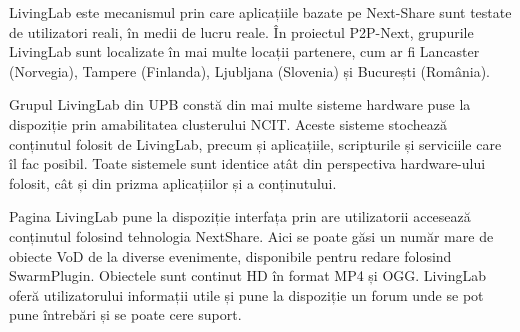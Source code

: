 LivingLab este mecanismul prin care aplicațiile bazate pe Next-Share sunt
testate de utilizatori reali, în medii de lucru reale. În proiectul P2P-Next,
grupurile LivingLab sunt localizate în mai multe locații partenere, cum ar fi
Lancaster (Norvegia), Tampere (Finlanda), Ljubljana (Slovenia) și București
(România).


Grupul LivingLab din UPB constă din mai multe sisteme hardware puse la
dispoziție prin amabilitatea clusterului NCIT. Aceste sisteme stochează
conținutul folosit de LivingLab, precum și aplicațiile, scripturile și
serviciile care îl fac posibil. Toate sistemele sunt identice atât din
perspectiva hardware-ului folosit, cât și din prizma aplicațiilor și a
conținutului.

Pagina LivingLab pune la
dispoziție interfața prin are utilizatorii accesează conținutul folosind
tehnologia NextShare. Aici se poate găsi un număr mare de obiecte VoD de la
diverse evenimente, disponibile pentru redare folosind SwarmPlugin. Obiectele
sunt continut HD în format MP4 și OGG. LivingLab oferă utilizatorului informații
utile și pune la dispoziție un forum unde se pot pune întrebări și se poate
cere suport.

